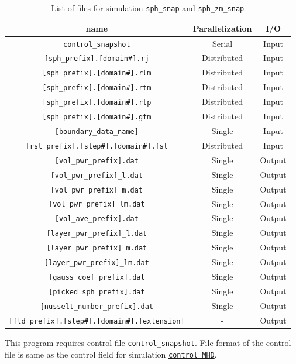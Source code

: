 \begin{table}[htp]
\caption{List of files for simulation {\tt sph\_snap} and {\tt sph\_zm\_snap} }
\begin{center} 
\begin{tabular}{|c|c|c|}
\hline
 name & Parallelization & I/O \\ \hline \hline
\verb|control_snapshot| & Serial & Input \\ \hline
\verb|[sph_prefix].[domain#].rj|  & Distributed & Input \\
\verb|[sph_prefix].[domain#].rlm| & Distributed & Input \\
\verb|[sph_prefix].[domain#].rtm| & Distributed & Input \\
\verb|[sph_prefix].[domain#].rtp| & Distributed & Input \\ \hline
\verb|[sph_prefix].[domain#].gfm| & Distributed & Input \\ \hline
\verb|[boundary_data_name]| & Single & Input \\ \hline
\verb|[rst_prefix].[step#].[domain#].fst| &  Distributed & Input  \\ \hline
\verb|[vol_pwr_prefix].dat| & Single & Output \\ \hline
\verb|[vol_pwr_prefix]_l.dat| & Single & Output \\
\verb|[vol_pwr_prefix]_m.dat| & Single & Output \\
\verb|[vol_pwr_prefix]_lm.dat| & Single & Output \\
\verb|[vol_ave_prefix].dat| & Single & Output \\ \hline
\verb|[layer_pwr_prefix]_l.dat| & Single & Output \\
\verb|[layer_pwr_prefix]_m.dat| & Single & Output \\
\verb|[layer_pwr_prefix]_lm.dat| & Single & Output \\ \hline
\verb|[gauss_coef_prefix].dat| & Single & Output   \\
\verb|[picked_sph_prefix].dat| & Single & Output   \\ \hline
\verb|[nusselt_number_prefix].dat| & Single & Output   \\ \hline
\verb|[fld_prefix].[step#].[domain#].[extension]| &  - & Output  \\ \hline
\end{tabular}
\end{center}
\label{table:sph_snap}
\end{table}
%
This program requires control file \verb|control_snapshot|. File format of the control file is same as the control field for simulation \hyperref[href_i:MHD_control]{\tt control\_MHD}.

